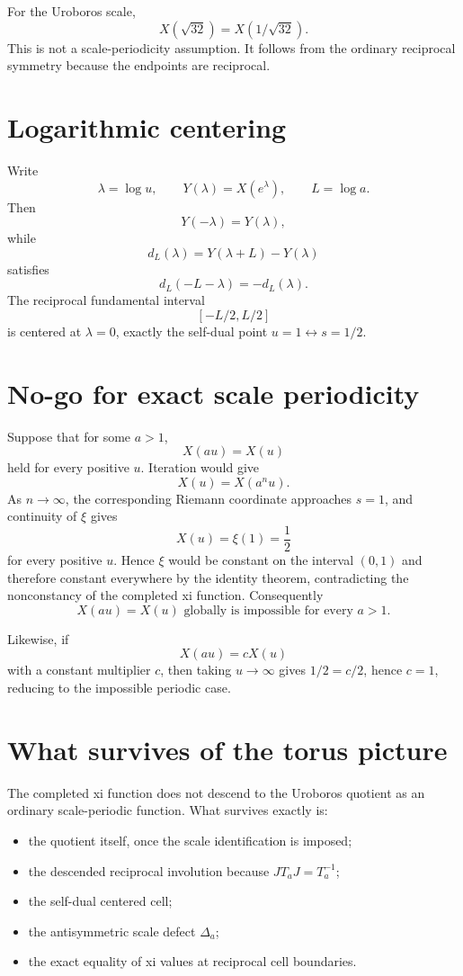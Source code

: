 For the Uroboros scale,
\[
\boxed{X(\sqrt{32})=X(1/\sqrt{32}).}
\]
This is not a scale-periodicity assumption.  It follows from the ordinary reciprocal symmetry because the endpoints are reciprocal.

\section{Logarithmic centering}

Write
\[
\lambda=\log u,\qquad Y(\lambda)=X(e^\lambda),\qquad L=\log a.
\]
Then
\[
Y(-\lambda)=Y(\lambda),
\]
while
\[
d_L(\lambda)=Y(\lambda+L)-Y(\lambda)
\]
satisfies
\[
\boxed{d_L(-L-\lambda)=-d_L(\lambda).}
\]
The reciprocal fundamental interval
\[
[-L/2,L/2]
\]
is centered at \(\lambda=0\), exactly the self-dual point \(u=1\leftrightarrow s=1/2\).

\section{No-go for exact scale periodicity}

Suppose that for some \(a>1\),
\[
X(au)=X(u)
\]
held for every positive \(u\).  Iteration would give
\[
X(u)=X(a^n u).
\]
As \(n\to\infty\), the corresponding Riemann coordinate approaches \(s=1\), and continuity of \(\xi\) gives
\[
X(u)=\xi(1)=\frac12
\]
for every positive \(u\).  Hence \(\xi\) would be constant on the interval \((0,1)\) and therefore constant everywhere by the identity theorem, contradicting the nonconstancy of the completed xi function.  Consequently
\[
\boxed{X(au)=X(u)\text{ globally is impossible for every }a>1.}
\]

Likewise, if
\[
X(au)=cX(u)
\]
with a constant multiplier \(c\), then taking \(u\to\infty\) gives \(1/2=c/2\), hence \(c=1\), reducing to the impossible periodic case.

\section{What survives of the torus picture}

The completed xi function does not descend to the Uroboros quotient as an ordinary scale-periodic function.  What survives exactly is:
\begin{itemize}
\item the quotient itself, once the scale identification is imposed;
\item the descended reciprocal involution because \(JT_aJ=T_a^{-1}\);
\item the self-dual centered cell;
\item the antisymmetric scale defect \(\Delta_a\);
\item the exact equality of xi values at reciprocal cell boundaries.
\end{itemize}

